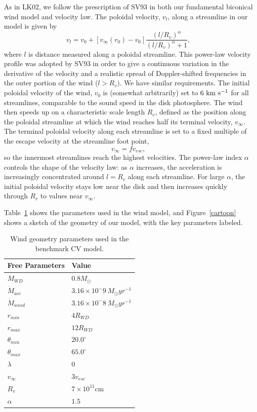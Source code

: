 \documentclass[useAMS,usenatbib, onecolumn]{mn2ejm}
\begin{document}
As in LK02, we follow the prescription of SV93 in both our fundamental biconical wind model and velocity law. 
The poloidal velocity, $v_l$, along a streamline in our model is given
by 
\begin{equation}
v_l=v_0+\left[v_{\infty}(r_0)-v_0\right]\frac{\left(l/R_v\right)^{\alpha}}{\left(l/R_v\right)^{\alpha}+1},
\label{v_law}
\end{equation}
where $l$ is distance measured along a poloidal streamline. This
power-law velocity profile was adopted by SV93 in order to give a 
continuous variation in the derivative of the velocity and a 
realistic spread of Doppler-shifted frequencies in the outer portion
of the wind (${l > R_v})$. We have similar requirements.
The initial poloidal velocity of the wind, $v_0$ is (somewhat
arbitrarily) set to $6~\rm{km~s^{-1}}$ for all streamlines, comparable
to the sound speed in the disk photosphere. The
wind then speeds up on a characteristic scale length $R_v$, 
defined as the position along the poloidal streamline at which the
wind reaches half its terminal velocity, $v_{\infty}$.
The terminal poloidal velocity along each streamline is set to a fixed
multiple of the escape velocity at the streamline foot point, 
\begin{equation}
v_{\infty}=fv_{esc},
\label{v_infty}
\end{equation}
so the
innermost streamlines reach the highest velocities.
The power-law index $\alpha$ controls the shape of the velocity
law: as $\alpha$ increases, the acceleration is increasingly
concentrated around $l = R_v$ along each streamline. 
For large $\alpha$, the initial poloidal velocity
stays low near the disk and then increases quickly through $R_v$ to 
values near $v_\infty$. 

Table~\ref{wind_param} shows the parameters used in the wind model, and Figure~\ref{cartoon}
shows a sketch of the geometry of our model, with the key parameters labeled.

\begin{table}
\centering
\begin{tabular}{p{3cm}p{4cm}}
\hline Free Parameters 	&	 Value \\ 
\hline \hline 
$M_{WD}$ 	 &	 $0.8 M_{\odot}$ \\ 
$\dot{M}_{acc}$ 	 &	 $3.16\times 10^-9~M_{\odot}yr^{-1}$\\ 
$\dot{M}_{wind}$  &	$3.16\times 10^-8~M_{\odot}yr^{-1}$\\ 
$r_{min}$ 	&	 $4 R_{WD}$\\ 
$r_{max}$ 	&	 $12 R_{WD}$ \\ 
$\theta_{min}$ 	&	 $20.0^{\circ}$ \\ 
$\theta_{max}$ 	&	 $65.0^{\circ}$ \\ 
$\lambda$ 	&	 $0$ \\ 
$v_{\infty}$ 	&	 $3v_{esc}$ \\ 
$R_v$ 	        &	 $7\times10^{11}$cm \\ 
$\alpha$ 	&	 $1.5$ \\
\end{tabular}
\centering
\caption{Wind geometry parameters used in the benchmark CV model.}
\label{wind_param}
\end{table}
\end{document}
